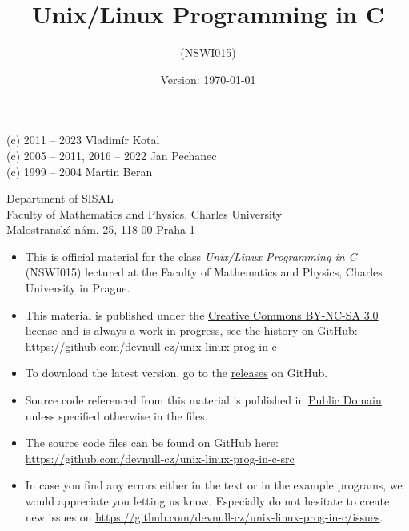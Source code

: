\documentclass[article]{seminar}
\begin{document}
\begin{slide}
\centerslidestrue
\begin{center}
\title{\LARGE Unix/Linux Programming in C}
\author{(NSWI015)}
\date{Version: \rm\today}
\maketitle

\vspace{2ex}
{\small (c) 2011 -- 2023 Vladim\'{i}r Kotal}\\
{\small (c) 2005 -- 2011, 2016 -- 2022 Jan Pechanec}\\
{\small (c) 1999 -- 2004 Martin Beran}

\vspace{2ex}
Department of SISAL\\
Faculty of Mathematics and Physics, Charles University\\
Malostransk\'{e} n\'{a}m. 25, 118 00 Praha 1

\end{center}
\end{slide}

\begin{itemize}
\item This is official material for the class \emph{Unix/Linux Programming in C}
(NSWI015) lectured at the Faculty of Mathematics and Physics, Charles University
in Prague.
\item This material is published under the
\href{http://creativecommons.org/licenses/by-nc-sa/3.0/cz/}{Creative Commons
BY-NC-SA 3.0} license and is always a work in progress, see the history on
GitHub:\\
\url{https://github.com/devnull-cz/unix-linux-prog-in-c}
\item To download the latest version, go to the
\href{https://github.com/devnull-cz/unix-linux-prog-in-c/releases}{releases}
on GitHub.
\item Source code referenced from this material is published in
\href{http://creativecommons.org/licenses/publicdomain/}{Public Domain} unless
specified otherwise in the files.
\item The source code files can be found on GitHub here:\\
\url{https://github.com/devnull-cz/unix-linux-prog-in-c-src}
\item In case you find any errors either in the text or in the example programs,
we would appreciate you letting us know. Especially do not hesitate to create new
issues on \url{https://github.com/devnull-cz/unix-linux-prog-in-c/issues}.
\end{itemize}
\end{document}
